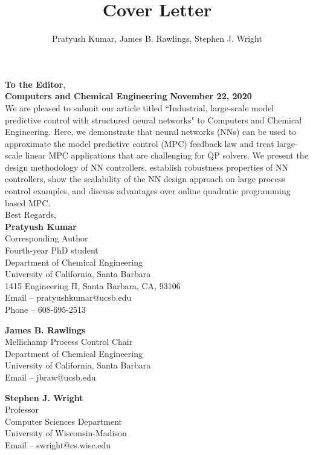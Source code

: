 \documentclass[xcolor=dvipsnames, 11pt]{article}
\title{Cover Letter}
\author{Pratyush Kumar, James B. Rawlings, Stephen J. Wright}
\begin{document}
\vspace{0.1in}
\noindent \textbf{To the Editor}, \\
\textbf{Computers and Chemical Engineering} \hfill \textbf{November 22, 2020} \\

\noindent We are pleased to submit our article titled ``Industrial, large-scale
model predictive control with structured neural networks" to Computers and
Chemical Engineering. Here, we demonstrate that neural networks (NNs) can be
used to approximate the model predictive control (MPC) feedback law and treat
large-scale linear MPC applications that are challenging for QP solvers. We
present the design methodology of NN controllers, establish robustness
properties of NN controllers, show the scalability of the NN design approach on
large process control examples, and discuss advantages over online quadratic
programming based MPC.  \\

\medskip
\noindent Best Regards, \\

\noindent \textbf{Pratyush Kumar} \\ 
Corresponding Author \\
Fourth-year PhD student \\
Department of Chemical Engineering \\
University of California, Santa Barbara \\ 
1415 Engineering II, Santa Barbara, CA, 93106 \\
Email -- pratyushkumar@ucsb.edu\\
Phone -- 608-695-2513 \\

\medskip

\noindent \textbf{James B. Rawlings} \\ 
Mellichamp Process Control Chair \\
Department of Chemical Engineering \\
University of California, Santa Barbara \\ 
Email -- jbraw@ucsb.edu \\

\medskip

\noindent \textbf{Stephen J. Wright} \\ 
Professor \\
Computer Sciences Department \\
University of Wisconsin-Madison \\ 
Email -- swright@cs.wisc.edu\\
\end{document}
